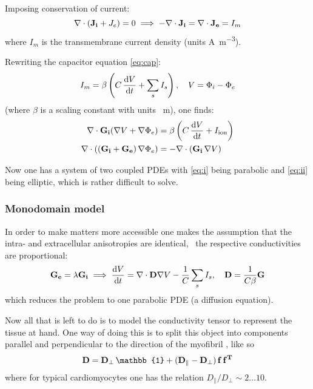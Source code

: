 Imposing conservation of current:
\begin{equation}
    \nabla\cdot(\mathbf{J_i}+{J_e})=0 \implies
    -\nabla\cdot\mathbf{J_i}=\nabla\cdot\mathbf{J_e}=I_m
\end{equation}
where $I_m$ is the transmembrane current density (units
\si{\ampere\per\metre\cubed}).

Rewriting the capacitor equation \eqref{eq:cap}:
\begin{equation}
    I_m=\beta\left(C\,\dv{V}{t}+\sum_{s}I_{s}\right),\quad V=\Phi_i-\Phi_e
\end{equation}
(where $\beta$ is a scaling constant with units \si{\per\metre}), one finds:
\begin{subequations}
\begin{align}
    \nabla\cdot\mathbf{G_i}(\nabla{V}+\nabla\Phi_e)
    &=\beta\left(C\,\dv{V}{t}+I_{\mathrm{ion}}\right)
    \label{eq:i}
    \\
    \nabla\cdot\left((\mathbf{G_i}+\mathbf{G_e})\,\nabla\Phi_e\right)
    &=-\nabla\cdot(\mathbf{G_i}\,\nabla{V})
    \label{eq:ii}
\end{align}
\end{subequations}

Now one has a system of two coupled PDEs with \eqref{eq:i} being parabolic
and \eqref{eq:ii} being elliptic, which is rather difficult to solve.

\subsubsection{Monodomain model}
In order to make matters more accessible one makes the assumption that the
intra- and extracellular anisotropies are identical, \ie~the respective
conductivities are proportional:
\begin{equation}
    \mathbf{G_e}=\lambda\mathbf{G_i} \implies
    \dv{V}{t}=\nabla\cdot{\ensuremath{\mathbf{D}}}\nabla{V}-\frac{1}{C}\sum_{s}I_{s},
    \quad \mathbf{D}=\frac{1}{C\beta}\mathbf{G}
\end{equation}
which reduces the problem to one parabolic PDE (a diffusion equation).

Now all that is left to do is to model the conductivity tensor  to
represent the tissue at hand.
One way of doing this is to split this object
into components parallel and perpendicular to the direction of the
myofibril , like so
\begin{equation}
    \myten{D}=\myten{D_{\perp}}\,\mathbb{1}+(\myten{D_{\parallel}}
    -\myten{D_{\perp}})\,\myvec{f}\,\myvec{f^T}
\end{equation}
where for typical cardiomyocytes one has the relation
$D_{\parallel}/D_{\perp}\sim2\ldots10$.

